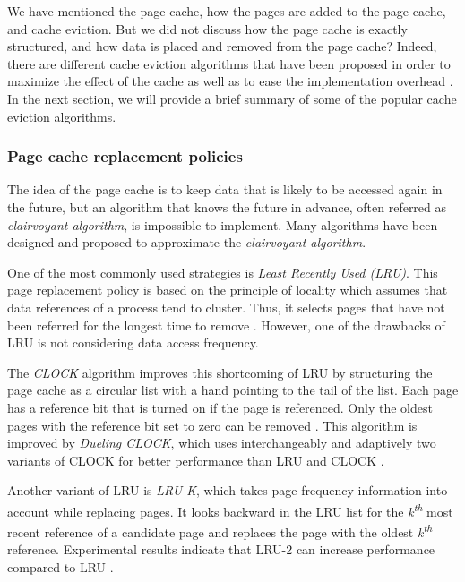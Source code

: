 We have mentioned the page cache, how the pages are added to the page cache, 
and cache eviction. But we did not discuss how the page cache is exactly structured, 
and how data is placed and removed from the page cache?
Indeed, there are different cache eviction algorithms that have been 
proposed in order to maximize the effect of the cache as well as to 
ease the implementation overhead \cite{chavan2011comparison}.
In the next section, we will provide a brief summary of some of the popular 
cache eviction algorithms.

\subsubsection{Page cache replacement policies}

The idea of the page cache is to keep data that is likely to be accessed again 
in the future, but an algorithm that knows the future in advance, often 
referred as \textit{clairvoyant algorithm}, is impossible to implement. 
Many algorithms have been designed and proposed to approximate the 
\textit{clairvoyant algorithm}. 

One of the most commonly used strategies is \textit{Least Recently Used (LRU)}. 
This page replacement policy is based on the principle of locality which assumes    
that data references of a process tend to cluster. 
Thus, it selects pages that have not been referred for the longest time to remove 
\cite{chavan2011comparison}. However, one of the drawbacks of LRU 
is not considering data access frequency.

The \textit{CLOCK} algorithm improves this shortcoming of LRU by 
structuring the page cache as a circular list with a hand pointing to 
the tail of the list.
Each page has a reference bit that is turned on if the page is referenced. 
Only the oldest pages with the reference bit set to zero can be removed 
\cite{chavan2011comparison}. 
This algorithm is improved by \textit{Dueling CLOCK}, which uses 
interchangeably and adaptively two variants of CLOCK for better 
performance than LRU and CLOCK \cite{chavan2011comparison}.

Another variant of LRU is \textit{LRU-K}, which takes page frequency 
information  into account while replacing pages. It looks backward in the 
LRU list for the \textit{k\textsuperscript{th}} most recent reference of 
a candidate page and replaces the page with the oldest 
\textit{k\textsuperscript{th}} reference. 
Experimental results indicate that LRU-2 can increase performance 
compared to LRU \cite{chavan2011comparison}. 

